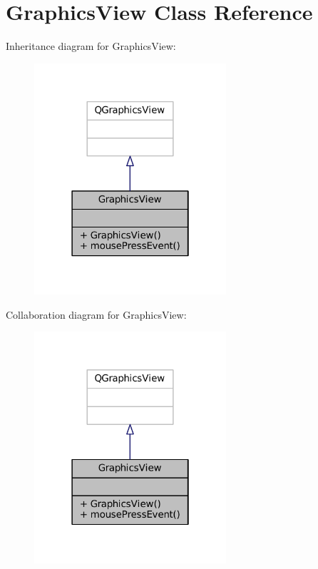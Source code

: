 \hypertarget{classGraphicsView}{}\section{Graphics\+View Class Reference}
\label{classGraphicsView}


Inheritance diagram for Graphics\+View\+:
\nopagebreak
\begin{figure}[H]
\begin{center}
\leavevmode
\includegraphics[width=202pt]{classGraphicsView__inherit__graph}
\end{center}
\end{figure}


Collaboration diagram for Graphics\+View\+:
\nopagebreak
\begin{figure}[H]
\begin{center}
\leavevmode
\includegraphics[width=202pt]{classGraphicsView__coll__graph}
\end{center}
\end{figure}
